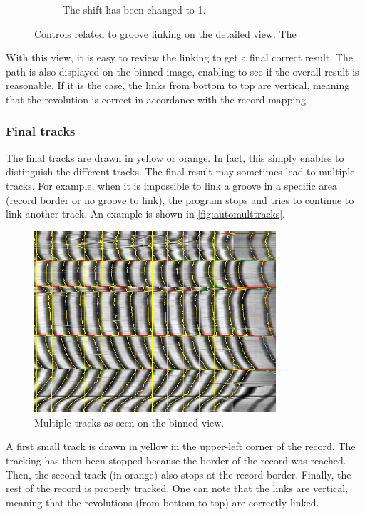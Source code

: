\begin{figure}[!ht]
\begin{subfigure}[t]{0.45\textwidth}
    \caption{The shift has been changed to 1.}
    \label{fig:autodetcontrols2}
    \end{subfigure}
    \caption{Controls related to groove linking on the detailed view. The }
    \label{fig:autodetcontrols}
\end{figure}

With this view, it is easy to review the linking to get a final correct result. The path is also displayed on the binned image, enabling to see if the overall result is reasonable. If it is the case, the links from bottom to top are vertical, meaning that the revolution is correct in accordance with the record mapping.

\subsubsection{Final tracks}

The final tracks are drawn in yellow or orange. In fact, this simply enables to distinguish the different tracks. The final result may sometimes lead to multiple tracks. For example, when it is impossible to link a groove in a specific area (record border or no groove to link), the program stops and tries to continue to link another track. An example is shown in \autoref{fig:automulttracks}.

\begin{figure}[!ht]
\centering
\includegraphics[width=0.8\textwidth]{images/auto-multiple-tracks}
\caption{Multiple tracks as seen on the binned view.}
\label{fig:automulttracks}
\end{figure}

A first small track is drawn in yellow in the upper-left corner of the record. The tracking has then been stopped because the border of the record was reached. Then, the second track (in orange) also stops at the record border. Finally, the rest of the record is properly tracked. One can note that the links are vertical, meaning that the revolutions (from bottom to top) are correctly linked.

